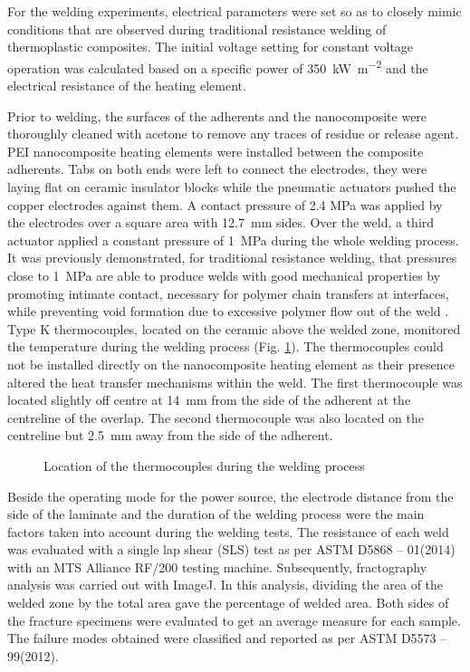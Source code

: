 \documentclass[11pt,review,times]{elsarticle}
\begin{document}
For the welding experiments, electrical parameters were set so as to closely mimic conditions that are observed during traditional resistance welding of thermoplastic composites. 
The initial voltage setting for constant voltage operation was calculated based on a specific power of \SI{350}{\kW\per\square\metre} and the electrical resistance of the heating element. 

Prior to welding, the surfaces of the adherents and the nanocomposite were thoroughly cleaned with acetone to remove any traces of residue or release agent. 
PEI nanocomposite heating elements were installed between the composite adherents. 
Tabs on both ends were left to connect the electrodes, they were laying flat on ceramic insulator blocks while the pneumatic actuators pushed the copper electrodes against them. 
A contact pressure of 2.4 MPa was applied by the electrodes over a square area with \SI{12.7}{\milli\metre} sides. 
Over the weld, a third actuator applied a constant pressure of \SI{1}{\MPa} during the whole welding process. 
It was previously demonstrated, for traditional resistance welding, that pressures close to \SI{1}{\MPa} are able to produce welds with good mechanical properties by promoting intimate contact, necessary for polymer chain transfers at interfaces, while preventing void formation due to excessive polymer flow out of the weld \cite{Ageorges2000a, Dube2007, Shi2014}. 
Type K thermocouples, located on the ceramic above the welded zone, monitored the temperature during the welding process (Fig. \ref{fig:location_thermocouple}). 
The thermocouples could not be installed directly on the nanocomposite heating element as their presence altered the heat transfer mechanisms within the weld. 
The first thermocouple was located slightly off centre at \SI{14}{\milli\metre} from the side of the adherent at the centreline of the overlap. 
The second thermocouple was also located on the centreline but \SI{2.5}{\milli\metre} away from the side of the adherent.  

\begin{figure}
		\center
		\captionsetup{width=60mm}
		\caption{Location of the thermocouples during the welding process}
		\label{fig:location_thermocouple}
\end{figure} 

Beside the operating mode for the power source, the electrode distance from the side of the laminate and the duration of the welding process were the main factors taken into account during the welding tests. 
The resistance of each weld was evaluated with a single lap shear (SLS) test as per ASTM D5868 – 01(2014) with an MTS Alliance RF/200 testing machine. 
Subsequently, fractography analysis was carried out with ImageJ. 
In this analysis, dividing the area of the welded zone by the total area gave the percentage of welded area. 
Both sides of the fracture specimens were evaluated to get an average measure for each sample. 
The failure modes obtained were classified and reported as per ASTM D5573 – 99(2012). 
\end{document}
